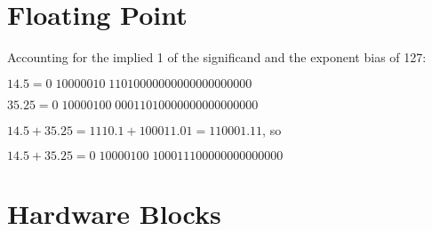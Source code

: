 \documentclass[12pt,letterpaper]{article}
\begin{document}
\section*{Floating Point}

Accounting for the implied 1 of the significand and the exponent bias of 127:

$14.5 = 0 \; 10000010 \; 11010000000000000000000$

$35.25 = 0 \; 10000100 \; 00011010000000000000000$

$14.5 + 35.25 = 1110.1 + 100011.01 = 110001.11$, so

$14.5 + 35.25 = 0 \; 10000100 \; 100011100000000000000$


\section*{Hardware Blocks}
\end{document}
